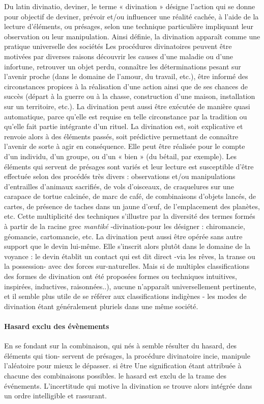 Du latin divinatio, deviner, le terme « divination » désigne l'action qui se donne pour objectif de deviner, prévoir et/ou influencer une réalité cachée, à l'aide de la lecture d'éléments, ou présages, selon une technique particulière impliquant leur observation ou leur manipulation. Ainsi définie, la divination apparaît comme une pratique universelle des sociétés  Les procédures divinatoires peuvent être motivées par diverses raisons découvrir les causes d'une maladie ou d'une infortune, retrouver un objet perdu, connaître les déterminations pesant sur l'avenir proche (dans le domaine de l'amour, du travail, etc.), être informé des circonstances propices à la réalisation d'une action ainsi que de ses chances de succès (départ à la guerre ou à la chasse, construction d'une maison, installation sur un territoire, etc.). La divination peut aussi être exécutée de manière quasi automatique, parce qu'elle est requise en telle circonstance par la tradition ou qu'elle fait partie intégrante d'un rituel. La divination est, soit explicative   et renvoie alors à des éléments passés, soit prédictive permettant de
connaître l'avenir de sorte à agir en conséquence. Elle peut être réalisée pour le compte d'un individu, d'un groupe, ou d'un « bien » (du bétail, par exemple).
Les éléments qui servent de présages sont variés et leur lecture est susceptible d'être effectuée selon des procédés très divers : observations et/ou manipulations d'entrailles d'animaux sacrifiés, de vols d'oisceaux, de craquelures sur une carapace de tortue calcinée, de marc de café, de combinaisons d'objets lancés, de cartes, de présence de taches dans un jaune d'œuf, de l'emplacement des planètes, etc. Cette multiplicité des techniques s'illustre par la diversité des termes formés à partir de la racine grec \textit{mantiké} -divination-pour les désigner : chiromancie, géomancie, cartomancie, etc. La divination peut aussi être opérée sans autre support que le devin lui-même. Elle s'inscrit alors plutôt dans le domaine de la voyance : le devin établit un contact qui est dit direct -via les rêves, la transe ou la possession- avec des forces sur-naturelles. Mais si de multiples classifications des formes de divination ont été proposées formes ou techniques intuitives, inspirées, inductives, raisonnées..), aucune n'apparaît universellement pertinente, et il semble plus utile de se référer aux classifications indigènes
- les modes de divination étant généralement pluriels dans une même société.

\paragraph{Hasard exclu des évènements}
En se fondant sur la combinaison, qui
nés à semble résulter du hasard, des éléments qui tion- servent de présages, la procédure divinatoire incie, manipule l'aléatoire pour mieux le dépasser.
si être
Une signification étant attribuée à chacune
 des combinaisons possibles. le hasard est   exclu de la trame des événements. L'incertitude qui motive la divination se trouve alors   intégrée dans un ordre intelligible et
  rassurant.

